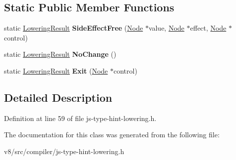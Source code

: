\subsection*{Static Public Member Functions}
\begin{DoxyCompactItemize}
\item 
\mbox{\label{classv8_1_1internal_1_1compiler_1_1JSTypeHintLowering_1_1LoweringResult_ab5784165a63b26b11b2d738022ab7639}} 
static \mbox{\hyperlink{classv8_1_1internal_1_1compiler_1_1JSTypeHintLowering_1_1LoweringResult}{Lowering\+Result}} {\bfseries Side\+Effect\+Free} (\mbox{\hyperlink{classv8_1_1internal_1_1compiler_1_1Node}{Node}} $\ast$value, \mbox{\hyperlink{classv8_1_1internal_1_1compiler_1_1Node}{Node}} $\ast$effect, \mbox{\hyperlink{classv8_1_1internal_1_1compiler_1_1Node}{Node}} $\ast$control)
\item 
\mbox{\label{classv8_1_1internal_1_1compiler_1_1JSTypeHintLowering_1_1LoweringResult_abcc30dcfe2b9ae6164e6bf37c55f9ccf}} 
static \mbox{\hyperlink{classv8_1_1internal_1_1compiler_1_1JSTypeHintLowering_1_1LoweringResult}{Lowering\+Result}} {\bfseries No\+Change} ()
\item 
\mbox{\label{classv8_1_1internal_1_1compiler_1_1JSTypeHintLowering_1_1LoweringResult_aebd2a47fee1be786b2348dde44553bcd}} 
static \mbox{\hyperlink{classv8_1_1internal_1_1compiler_1_1JSTypeHintLowering_1_1LoweringResult}{Lowering\+Result}} {\bfseries Exit} (\mbox{\hyperlink{classv8_1_1internal_1_1compiler_1_1Node}{Node}} $\ast$control)
\end{DoxyCompactItemize}


\subsection{Detailed Description}


Definition at line 59 of file js-\/type-\/hint-\/lowering.\+h.



The documentation for this class was generated from the following file\+:\begin{DoxyCompactItemize}
\item 
v8/src/compiler/js-\/type-\/hint-\/lowering.\+h\end{DoxyCompactItemize}
